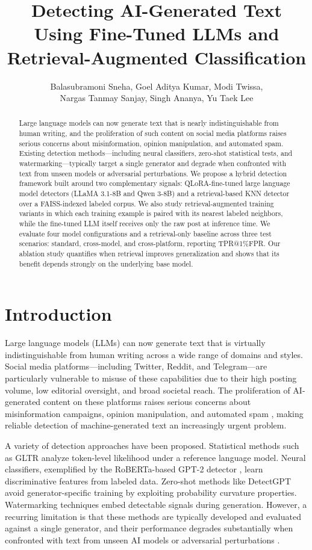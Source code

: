 \documentclass[letterpaper]{article} %
\title{Detecting AI-Generated Text Using Fine-Tuned LLMs and Retrieval-Augmented Classification}
\author{
    Balasubramoni Sneha,
    Goel Aditya Kumar,
    Modi Twissa,\\
    Nargas Tanmay Sanjay,
    Singh Ananya,
    Yu Taek Lee
}
\begin{document}
\maketitle

\begin{abstract}
Large language models can now generate text that is nearly indistinguishable from human writing, and the proliferation of such content on social media platforms raises serious concerns about misinformation, opinion manipulation, and automated spam. Existing detection methods---including neural classifiers, zero-shot statistical tests, and watermarking---typically target a single generator and degrade when confronted with text from unseen models or adversarial perturbations. We propose a hybrid detection framework built around two complementary signals: QLoRA-fine-tuned large language model detectors (LLaMA 3.1-8B and Qwen 3-8B) and a retrieval-based KNN detector over a FAISS-indexed labeled corpus. We also study retrieval-augmented training variants in which each training example is paired with its nearest labeled neighbors, while the fine-tuned LLM itself receives only the raw post at inference time. We evaluate four model configurations and a retrieval-only baseline across three test scenarios: standard, cross-model, and cross-platform, reporting TPR@1\%FPR. Our ablation study quantifies when retrieval improves generalization and shows that its benefit depends strongly on the underlying base model.
\end{abstract}

\section{Introduction}

Large language models (LLMs) \cite{openai2023gpt4, qwen2024} can now generate text that is virtually indistinguishable from human writing across a wide range of domains and styles. Social media platforms---including Twitter, Reddit, and Telegram---are particularly vulnerable to misuse of these capabilities due to their high posting volume, low editorial oversight, and broad societal reach. The proliferation of AI-generated content on these platforms raises serious concerns about misinformation campaigns, opinion manipulation, and automated spam \cite{goldstein2023}, making reliable detection of machine-generated text an increasingly urgent problem.

A variety of detection approaches have been proposed. Statistical methods such as GLTR \cite{gehrmann2019gltr} analyze token-level likelihood under a reference language model. Neural classifiers, exemplified by the RoBERTa-based GPT-2 detector \cite{solaiman2019release}, learn discriminative features from labeled data. Zero-shot methods like DetectGPT \cite{mitchell2023detectgpt} avoid generator-specific training by exploiting probability curvature properties. Watermarking techniques \cite{kirchenbauer2023watermark} embed detectable signals during generation. However, a recurring limitation is that these methods are typically developed and evaluated against a single generator, and their performance degrades substantially when confronted with text from unseen AI models or adversarial perturbations \cite{dugan2024raid, sadasivan2023}.
\end{document}
